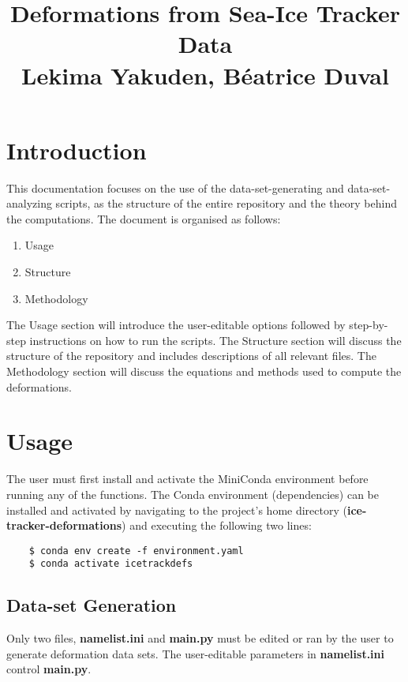 \documentclass[12pt]{article}
\begin{document}
\title{%
  Deformations from Sea-Ice Tracker Data \\
  \large Lekima Yakuden, Béatrice Duval}

\section*{Introduction}

This documentation focuses on the use of the data-set-generating and data-set-analyzing scripts, as the structure of the entire repository and the theory behind the computations. The document is organised as follows:

\begin{enumerate}
    \item Usage
    \item Structure
    \item Methodology
\end{enumerate}

The Usage section will introduce the user-editable options followed by step-by-step instructions on how to run the scripts. The Structure section will discuss the structure of the repository and includes descriptions of all relevant files. The Methodology section will discuss the equations and methods used to compute the deformations.

\section{Usage}\label{Usage}

The user must first install and activate the MiniConda environment before running any of the functions. The Conda environment (dependencies) can be installed and activated by navigating to the project's home directory (\textbf{ice-tracker-deformations}) and executing the following two lines:

\begin{verbatim}
    $ conda env create -f environment.yaml
    $ conda activate icetrackdefs
\end{verbatim}



\subsection{Data-set Generation}

Only two files, \textbf{namelist.ini} and \textbf{main.py} must be edited or ran by the user to generate deformation data sets. The user-editable parameters in \textbf{namelist.ini} control \textbf{main.py}.
\end{document}
